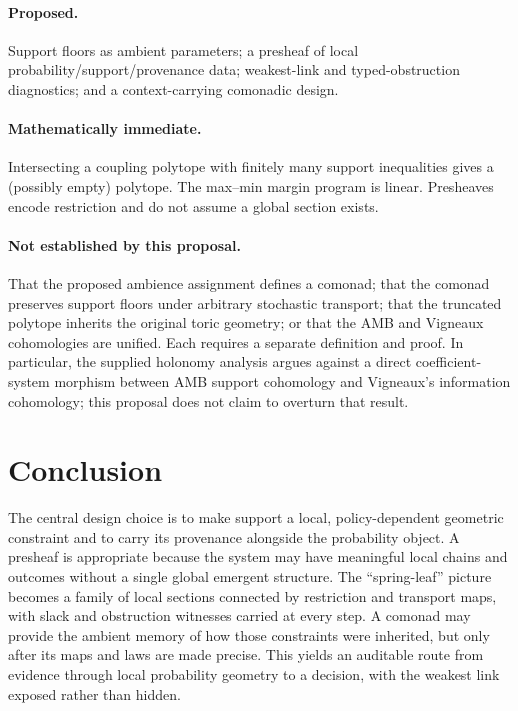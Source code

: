 \documentclass[11pt]{article}
\begin{document}
\paragraph{Proposed.} Support floors as ambient parameters; a presheaf of local probability/support/provenance data; weakest-link and typed-obstruction diagnostics; and a context-carrying comonadic design.

\paragraph{Mathematically immediate.} Intersecting a coupling polytope with finitely many support inequalities gives a (possibly empty) polytope. The max--min margin program is linear. Presheaves encode restriction and do not assume a global section exists.

\paragraph{Not established by this proposal.} That the proposed ambience assignment defines a comonad; that the comonad preserves support floors under arbitrary stochastic transport; that the truncated polytope inherits the original toric geometry; or that the AMB and Vigneaux cohomologies are unified. Each requires a separate definition and proof. In particular, the supplied holonomy analysis argues against a direct coefficient-system morphism between AMB support cohomology and Vigneaux's information cohomology; this proposal does not claim to overturn that result.

\section{Conclusion}

The central design choice is to make support a local, policy-dependent geometric constraint and to carry its provenance alongside the probability object. A presheaf is appropriate because the system may have meaningful local chains and outcomes without a single global emergent structure. The ``spring-leaf'' picture becomes a family of local sections connected by restriction and transport maps, with slack and obstruction witnesses carried at every step. A comonad may provide the ambient memory of how those constraints were inherited, but only after its maps and laws are made precise. This yields an auditable route from evidence through local probability geometry to a decision, with the weakest link exposed rather than hidden.
\end{document}
